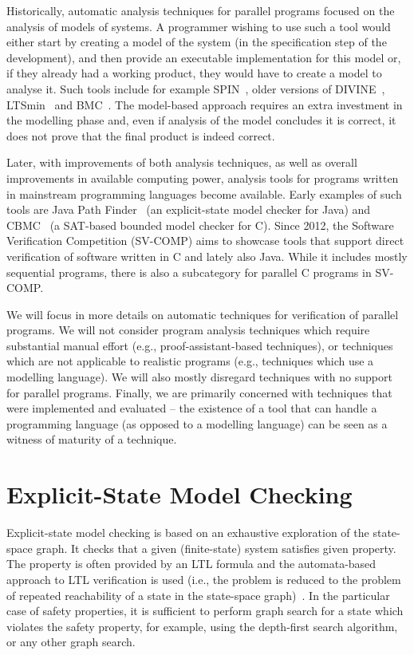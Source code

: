 Historically, automatic analysis techniques for parallel programs focused on the analysis of models of systems.
A programmer wishing to use such a tool would either start by creating a model
of the system (in the specification step of the development), and then provide
an executable implementation for this model or, if they already had a working
product, they would have to create a model to analyse it.
Such tools include for example SPIN~, older versions of DIVINE~, LTSmin~ and BMC~.
The model-based approach requires an extra investment in the modelling phase
and, even if analysis of the model concludes it is correct, it does not prove
that the final product is indeed correct.

Later, with improvements of both analysis techniques, as well as overall
improvements in available computing power, analysis tools for programs written
in mainstream programming languages become available.
Early examples of such tools are Java Path Finder~ (an explicit-state model checker for Java) and CBMC~ (a SAT-based bounded model checker for C).
Since 2012, the Software Verification Competition (SV-COMP) 
aims to showcase tools that support direct verification of software written in
C and lately also Java.
While it includes mostly sequential programs, there is also a subcategory for
parallel C programs in SV-COMP.

We will focus in more details on automatic techniques for verification of
parallel programs.
We will not consider program analysis techniques which require substantial manual effort (e.g., proof-assistant-based techniques), or techniques which are not applicable to realistic programs (e.g., techniques which use a modelling language).
We will also mostly disregard techniques with no support for parallel programs.
Finally, we are primarily concerned with techniques that were implemented and evaluated -- the existence of a tool that can handle a programming language (as opposed to a modelling language) can be seen as a witness of maturity of a technique.

\section{Explicit-State Model Checking}

Explicit-state model checking is based on an exhaustive exploration of the
state-space graph.
It checks that a given (finite-state) system satisfies given property.
The property is often provided by an LTL formula and the automata-based approach
to LTL verification is used (i.e., the problem is reduced to the problem of
repeated reachability of a state in the state-space graph)~.
In the particular case of safety properties, it is sufficient to perform graph
search for a state which violates the safety property, for example, using the
depth-first search algorithm, or any other graph search.

